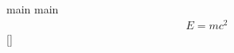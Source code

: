 \documentclass[10pt]{article}
\begin{document}
main main
\begin{align}\label{e1}
E = mc^{2}
\end{align}
\ref{}
\end{document}
